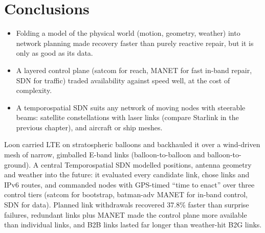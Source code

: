 \section{Conclusions}
\begin{itemize}
  \item Folding a model of the physical world (motion, geometry, weather) into network planning made recovery faster than purely reactive repair, but it is only as good as
        its data.
  \item A layered control plane (satcom for reach, MANET for fast in-band repair, SDN for traffic) traded availability against speed well, at the cost of complexity.
  \item A temporospatial SDN suits any network of moving nodes with steerable beams: satellite constellations with laser links (compare Starlink in the previous chapter), and
        aircraft or ship meshes.
\end{itemize}

\begin{keybox}
Loon carried LTE on stratospheric balloons and backhauled it over a wind-driven mesh of narrow, gimballed E-band links (balloon-to-balloon and balloon-to-ground). A central
Temporospatial SDN modelled positions, antenna geometry and weather into the future: it evaluated every candidate link, chose links and IPv6 routes, and commanded nodes with
GPS-timed ``time to enact'' over three control tiers (satcom for bootstrap, batman-adv MANET for in-band control, SDN for data). Planned link withdrawals recovered 37.8\% faster
than surprise failures, redundant links plus MANET made the control plane more available than individual links, and B2B links lasted far longer than weather-hit B2G links.
\end{keybox}

